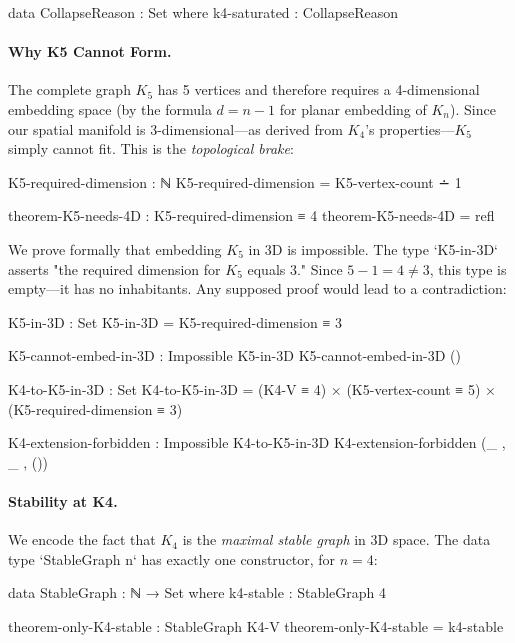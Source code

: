 \documentclass[11pt,a4paper]{book}
\begin{document}
\begin{code}
data CollapseReason : Set where
  k4-saturated : CollapseReason
\end{code}

\paragraph{Why K5 Cannot Form.}

The complete graph $K_5$ has 5 vertices and therefore requires a 4-dimensional embedding 
space (by the formula $d = n - 1$ for planar embedding of $K_n$). Since our spatial manifold 
is 3-dimensional—as derived from $K_4$'s properties—$K_5$ simply cannot fit. This is the 
\emph{topological brake}:

\begin{code}
K5-required-dimension : ℕ
K5-required-dimension = K5-vertex-count ∸ 1

theorem-K5-needs-4D : K5-required-dimension ≡ 4
theorem-K5-needs-4D = refl
\end{code}

We prove formally that embedding $K_5$ in 3D is impossible. The type `K5-in-3D` asserts 
"the required dimension for $K_5$ equals 3." Since $5 - 1 = 4 \neq 3$, this type is empty—it 
has no inhabitants. Any supposed proof would lead to a contradiction:

\begin{code}
K5-in-3D : Set
K5-in-3D = K5-required-dimension ≡ 3

K5-cannot-embed-in-3D : Impossible K5-in-3D
K5-cannot-embed-in-3D ()

K4-to-K5-in-3D : Set
K4-to-K5-in-3D = (K4-V ≡ 4) × (K5-vertex-count ≡ 5) × (K5-required-dimension ≡ 3)

K4-extension-forbidden : Impossible K4-to-K5-in-3D
K4-extension-forbidden (_ , _ , ())
\end{code}

\paragraph{Stability at K4.}

We encode the fact that $K_4$ is the \emph{maximal stable graph} in 3D space. The data type 
`StableGraph n` has exactly one constructor, for $n = 4$:

\begin{code}
data StableGraph : ℕ → Set where
  k4-stable : StableGraph 4

theorem-only-K4-stable : StableGraph K4-V
theorem-only-K4-stable = k4-stable
\end{code}
\end{document}
